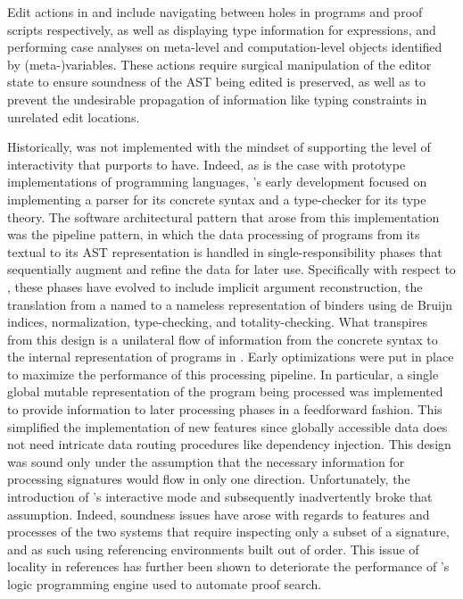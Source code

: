 
Edit actions in \Beluga and \Harpoon include navigating between holes in programs and proof scripts respectively, as well as displaying type information for expressions, and performing case analyses on meta-level and computation-level objects identified by (meta-)variables.
These actions require surgical manipulation of the editor state to ensure soundness of the \ac{AST} being edited is preserved, as well as to prevent the undesirable propagation of information like typing constraints in unrelated edit locations.


Historically, \Beluga was not implemented with the mindset of supporting the level of interactivity that \Harpoon purports to have.
Indeed, as is the case with prototype implementations of programming languages, \Beluga's early development focused on implementing a parser for its concrete syntax and a type-checker for its type theory.
The software architectural pattern that arose from this implementation was the pipeline pattern, in which the data processing of programs from its textual to its \ac{AST} representation is handled in single-responsibility phases that sequentially augment and refine the data for later use.
Specifically with respect to \Beluga, these phases have evolved to include implicit argument reconstruction, the translation from a named to a nameless representation of binders using de Bruijn indices, normalization, type-checking, and totality-checking.
What transpires from this design is a unilateral flow of information from the concrete syntax to the internal representation of programs in \Beluga.
Early optimizations were put in place to maximize the performance of this processing pipeline.
In particular, a single global mutable representation of the \Beluga program being processed was implemented to provide information to later processing phases in a feedforward fashion.
This simplified the implementation of new features since globally accessible data does not need intricate data routing procedures like dependency injection.
This design was sound only under the assumption that the necessary information for processing \Beluga signatures would flow in only one direction.
Unfortunately, the introduction of \Beluga's interactive mode and subsequently \Harpoon inadvertently broke that assumption.
Indeed, soundness issues have arose with regards to features and processes of the two systems that require inspecting only a subset of a signature, and as such using referencing environments built out of order.
This issue of locality in references has further been shown to deteriorate the performance of \Beluga's logic programming engine used to automate proof search.

